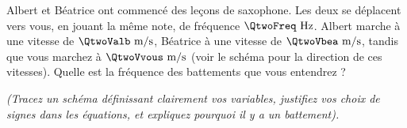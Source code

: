 
Albert et Béatrice ont commencé des leçons de saxophone. Les deux se déplacent vers vous, en jouant la même note, de fréquence $\QtwoFreq\text{ Hz}$. Albert marche à une vitesse de $\QtwoValb\text{ m/s}$, Béatrice à une vitesse de $\QtwoVbea\text{ m/s}$, tandis que vous marchez à $\QtwoVvous\text{ m/s}$ (voir le schéma pour la direction de ces vitesses). Quelle est la fréquence des battements que vous entendrez ?

\textit{(Tracez un schéma définissant clairement vos variables, justifiez vos choix de signes dans les équations, et expliquez pourquoi il y a un battement).}

\vspace{0.8cm}
\begin{center}
\end{center}
\vspace{0.8cm}